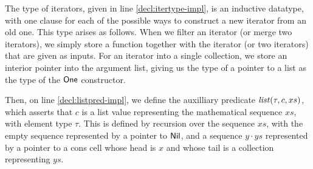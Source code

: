 The type of iterators, given in line \ref{decl:itertype-impl}, is an
inductive datatype, with one clause for each of the possible ways to
construct a new iterator from an old one. This type arises as
follows. When we filter an iterator (or merge two iterators), we
simply store a function together with the iterator (or two iterators)
that are given as inputs. For an iterator into a single collection, we
store an interior pointer into the argument list, giving us the type
of a pointer to a list as the type of the $\mathsf{One}$ constructor.

Then, on line \ref{decl:listpred-impl}, we define the auxilliary
predicate $\mathit{list}(\tau, c, xs)$, which asserts that $c$ is a list
value representing the mathematical sequence $xs$, with element type
$\tau$. This is defined by recursion over the sequence $xs$, with the
empty sequence represented by a pointer to $\mathsf{Nil}$, and a sequence 
$y\cdot ys$ represented by a pointer to a cons cell whose head is $x$
and whose tail is a collection representing $ys$. 

